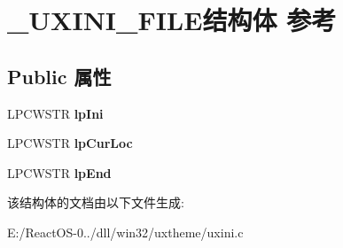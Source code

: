 \hypertarget{struct___u_x_i_n_i___f_i_l_e}{}\section{\+\_\+\+U\+X\+I\+N\+I\+\_\+\+F\+I\+L\+E结构体 参考}
\label{struct___u_x_i_n_i___f_i_l_e}
\subsection*{Public 属性}
\begin{DoxyCompactItemize}
\item 
\mbox{\label{struct___u_x_i_n_i___f_i_l_e_ad520664d7f77fa8d9749db1e61cc0ce9}} 
L\+P\+C\+W\+S\+TR {\bfseries lp\+Ini}
\item 
\mbox{\label{struct___u_x_i_n_i___f_i_l_e_a6c2b72292a3f41f69477d0c6ab0b41b7}} 
L\+P\+C\+W\+S\+TR {\bfseries lp\+Cur\+Loc}
\item 
\mbox{\label{struct___u_x_i_n_i___f_i_l_e_abb1a400a14ed162a6520956e2faa161f}} 
L\+P\+C\+W\+S\+TR {\bfseries lp\+End}
\end{DoxyCompactItemize}


该结构体的文档由以下文件生成\+:\begin{DoxyCompactItemize}
\item 
E\+:/\+React\+O\+S-\/0../dll/win32/uxtheme/uxini.\+c\end{DoxyCompactItemize}

